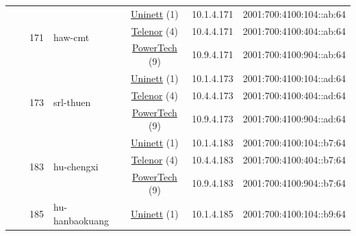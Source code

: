 \begin{small}
\begin{center}
\begin{longtable}{|c|c|c|c|c|c|c|c|}
  &  & \multirow{3}{*}{\tiny{171}} & \multicolumn{1}{|l|}{\multirow{3}{*}{\tiny{haw-cmt}}} & \multicolumn{2}{|c|}{\tiny{\href{https://www.uninett.no}{Uninett} (1)}} & \tiny{10.1.4.171} & \tiny{2001:700:4100:104::ab:64} \\* \cline{5-5}\cline{6-6}\cline{7-7}\cline{8-8}
  &  &  &  & \multicolumn{2}{|c|}{\tiny{\href{https://www.telenor.no}{Telenor} (4)}} & \tiny{10.4.4.171} & \tiny{2001:700:4100:404::ab:64} \\* \cline{5-5}\cline{6-6}\cline{7-7}\cline{8-8}
  &  &  &  & \multicolumn{2}{|c|}{\tiny{\href{http://www.powertech.no}{PowerTech} (9)}} & \tiny{10.9.4.171} & \tiny{2001:700:4100:904::ab:64} \\* \cline{3-3}\cline{4-4}\cline{5-5}\cline{6-6}\cline{7-7}\cline{8-8}
  &  & \multirow{3}{*}{\tiny{173}} & \multicolumn{1}{|l|}{\multirow{3}{*}{\tiny{srl-thuen}}} & \multicolumn{2}{|c|}{\tiny{\href{https://www.uninett.no}{Uninett} (1)}} & \tiny{10.1.4.173} & \tiny{2001:700:4100:104::ad:64} \\* \cline{5-5}\cline{6-6}\cline{7-7}\cline{8-8}
  &  &  &  & \multicolumn{2}{|c|}{\tiny{\href{https://www.telenor.no}{Telenor} (4)}} & \tiny{10.4.4.173} & \tiny{2001:700:4100:404::ad:64} \\* \cline{5-5}\cline{6-6}\cline{7-7}\cline{8-8}
  &  &  &  & \multicolumn{2}{|c|}{\tiny{\href{http://www.powertech.no}{PowerTech} (9)}} & \tiny{10.9.4.173} & \tiny{2001:700:4100:904::ad:64} \\* \cline{3-3}\cline{4-4}\cline{5-5}\cline{6-6}\cline{7-7}\cline{8-8}
  &  & \multirow{3}{*}{\tiny{183}} & \multicolumn{1}{|l|}{\multirow{3}{*}{\tiny{hu-chengxi}}} & \multicolumn{2}{|c|}{\tiny{\href{https://www.uninett.no}{Uninett} (1)}} & \tiny{10.1.4.183} & \tiny{2001:700:4100:104::b7:64} \\* \cline{5-5}\cline{6-6}\cline{7-7}\cline{8-8}
  &  &  &  & \multicolumn{2}{|c|}{\tiny{\href{https://www.telenor.no}{Telenor} (4)}} & \tiny{10.4.4.183} & \tiny{2001:700:4100:404::b7:64} \\* \cline{5-5}\cline{6-6}\cline{7-7}\cline{8-8}
  &  &  &  & \multicolumn{2}{|c|}{\tiny{\href{http://www.powertech.no}{PowerTech} (9)}} & \tiny{10.9.4.183} & \tiny{2001:700:4100:904::b7:64} \\* \cline{3-3}\cline{4-4}\cline{5-5}\cline{6-6}\cline{7-7}\cline{8-8}
  &  & \multirow{3}{*}{\tiny{185}} & \multicolumn{1}{|l|}{\multirow{3}{*}{\tiny{hu-hanbaokuang}}} & \multicolumn{2}{|c|}{\tiny{\href{https://www.uninett.no}{Uninett} (1)}} & \tiny{10.1.4.185} & \tiny{2001:700:4100:104::b9:64} \\* \cline{5-5}\cline{6-6}\cline{7-7}\cline{8-8}

\end{longtable}
\end{center}
\end{small}
